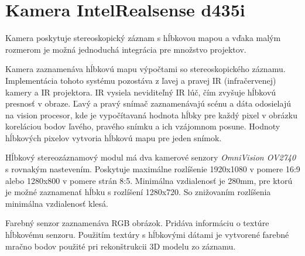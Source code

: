 \section{Kamera IntelRealsense d435i}\label{camera}
Kamera poskytuje stereoskopický záznam s hĺbkovou mapou a vďaka malým rozmerom je možná jednoduchá integrácia pre množstvo projektov. 

Kamera zaznamenáva hĺbkovú mapu výpočtami so stereoskopického záznamu. Implementácia tohoto systému pozostáva z ľavej a pravej IR (infračervenej) kamery a IR projektora. IR vysiela neviditeľný IR lúč, čím zvyšuje hĺbkovú presnosť v obraze. Ľavý a pravý snímač zaznamenávajú scénu a dáta odosielajú na vision procesor, kde je vypočítavaná hodnota hĺbky pre každý pixel v obrázku koreláciou bodov ľavého, pravého snímku a ich vzájomnom posune. Hodnoty hĺbkových pixelov vytvoria hĺbkovú mapu pre jeden snímok.

Hĺbkový stereozáznamový modul má dva kamerové senzory {\it OmniVision OV2740} s rovnakým nastevením. Poskytuje maximálne rozlíšenie 1920x1080 v pomere 16:9 alebo 1280x800 v pomere strán 8:5. Minimálna vzdialenosť je 280mm, pre ktorú je možné zaznamenať hĺbku s rozlíšení 1280x720. So znižovaním rozlíšenia minimálna vzdialenosť klesá.

Farebný senzor zaznamenáva RGB obrázok. Pridáva informáciu o textúre hĺbkovému senzoru. Použitím textúry s hĺbkovými dátami je vytvorené farebné mračno bodov použité pri rekonštrukcii 3D modelu zo záznamu.

